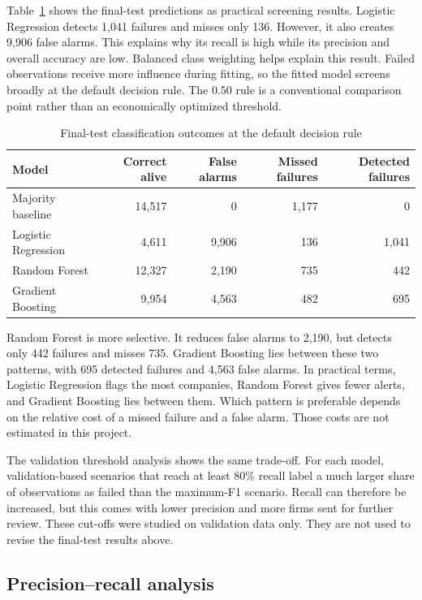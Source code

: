 \documentclass[11pt,a4paper]{article}
\begin{document}
Table~\ref{tab:test-confusion} shows the final-test predictions as practical
screening results. Logistic Regression detects 1,041 failures and misses only
136. However, it also creates 9,906 false alarms. This explains why its recall
is high while its precision and overall accuracy are low. Balanced class
weighting helps explain this result. Failed observations receive more
influence during fitting, so the fitted model screens broadly at the default
decision rule. The 0.50 rule is a conventional comparison point rather than an
economically optimized threshold.

\begin{table}[H]
  \centering
  \caption{Final-test classification outcomes at the default decision rule}
  \label{tab:test-confusion}
  \small
  \begin{tabular}{lrrrr}
    \toprule
    Model & Correct alive & False alarms & Missed failures & Detected failures \\
    \midrule
    Majority baseline    & 14,517 & 0     & 1,177 & 0     \\
    Logistic Regression  & 4,611  & 9,906 & 136   & 1,041 \\
    Random Forest        & 12,327 & 2,190 & 735   & 442   \\
    Gradient Boosting    & 9,954  & 4,563 & 482   & 695   \\
    \bottomrule
  \end{tabular}
\end{table}

Random Forest is more selective. It reduces false alarms to 2,190, but detects
only 442 failures and misses 735. Gradient Boosting lies between these two
patterns, with 695 detected failures and 4,563 false alarms. In practical
terms, Logistic Regression flags the most companies, Random Forest gives fewer
alerts, and Gradient Boosting lies between them. Which pattern
is preferable depends on the relative cost of a missed failure and a false
alarm. Those costs are not estimated in this project.

The validation threshold analysis shows the same trade-off. For each
model, validation-based scenarios that reach at least 80\% recall label a much
larger share of observations as failed than the maximum-F1 scenario. Recall can
therefore be increased, but this comes with lower precision and more firms sent
for further review. These cut-offs were studied on validation data only. They
are not used to revise the final-test results above.

\subsection{Precision--recall analysis}
\end{document}
